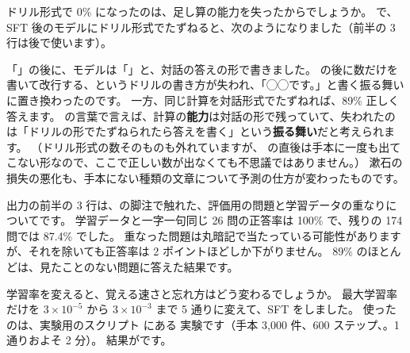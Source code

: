 ドリル形式で 0\% になったのは、足し算の能力を失ったからでしょうか。
 で、SFT 後のモデルにドリル形式でたずねると、次のようになりました（前半の 3 行は後で使います）。


「」の後に、モデルは「」と、対話の答えの形で書きました。
\code{=} の後に数だけを書いて改行する、というドリルの書き方が失われ、「◯◯です。」と書く振る舞いに置き換わったのです。
一方、同じ計算を対話形式でたずねれば、89\% 正しく答えます。
の言葉で言えば、計算の\textbf{能力}は対話の形で残っていて、失われたのは「ドリルの形でたずねられたら答えを書く」という\textbf{振る舞い}だと考えられます。
（ドリル形式の数そのものも外れていますが、\code{=} の直後は手本に一度も出てこない形なので、ここで正しい数が出なくても不思議ではありません。）
漱石の損失の悪化も、手本にない種類の文章について予測の仕方が変わったものです。

出力の前半の 3 行は、の脚注で触れた、評価用の問題と学習データの重なりについてです。
学習データと一字一句同じ 26 問の正答率は 100\% で、残りの 174 問では 87.4\% でした。
重なった問題は丸暗記で当たっている可能性がありますが、それを除いても正答率は 2 ポイントほどしか下がりません。
89\% のほとんどは、見たことのない問題に答えた結果です。

学習率を変えると、覚える速さと忘れ方はどう変わるでしょうか。
最大学習率だけを $3\times10^{-5}$ から $3\times10^{-3}$ まで 5 通りに変えて、SFT をしました。
使ったのは、実験用のスクリプト  にある  実験です（手本 3,000 件、600 ステップ、。1 通りおよそ 2 分）。
結果がです。

